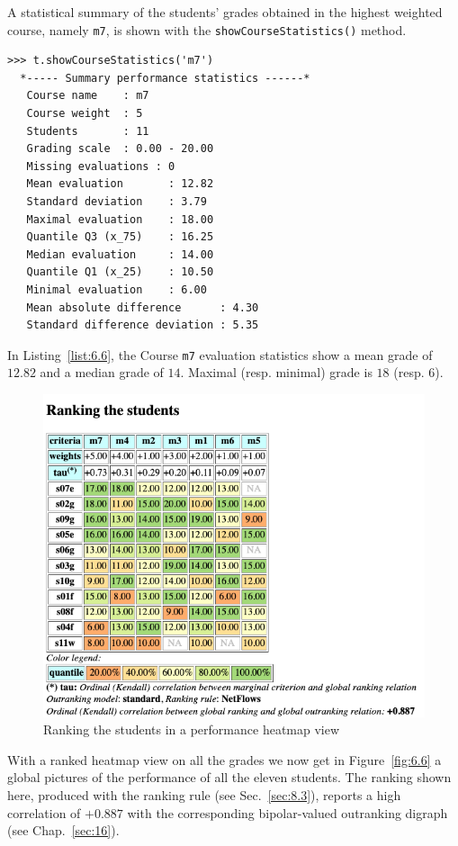 A statistical summary of the students' grades obtained in the highest weighted course, namely \texttt{m7}, is shown with the \texttt{showCourseStatistics()} method. 
\begin{lstlisting}[caption={Student performance summary statistics per course},label=list:6.6]
>>> t.showCourseStatistics('m7')
  *----- Summary performance statistics ------*
   Course name    : m7
   Course weight  : 5
   Students       : 11
   Grading scale  : 0.00 - 20.00
   Missing evaluations : 0
   Mean evaluation       : 12.82
   Standard deviation    : 3.79
   Maximal evaluation    : 18.00
   Quantile Q3 (x_75)    : 16.25
   Median evaluation     : 14.00
   Quantile Q1 (x_25)    : 10.50
   Minimal evaluation    : 6.00
   Mean absolute difference      : 4.30
   Standard difference deviation : 5.35
\end{lstlisting}

In Listing~\vref{list:6.6}, the Course \texttt{m7} evaluation statistics show a mean grade of $12.82$ and a median grade of $14$. Maximal (resp. minimal) grade is $18$ (resp. $6$).

\begin{figure}[ht]
\includegraphics[width=\hsize]{Figures/6-6-rankingStudents.png}
\caption{Ranking the students in a performance heatmap view}
\label{fig:6.6}       %
\end{figure}
With a ranked heatmap view on all the grades we now get in Figure~\vref{fig:6.6} a global pictures of the performance of all the eleven students. The ranking shown here, produced with the \NetFlows ranking rule (see Sec.~\ref{sec:8.3}), reports a high correlation of $+0.887$ with the corresponding bipolar-valued outranking digraph (see Chap.~\ref{sec:16}).

